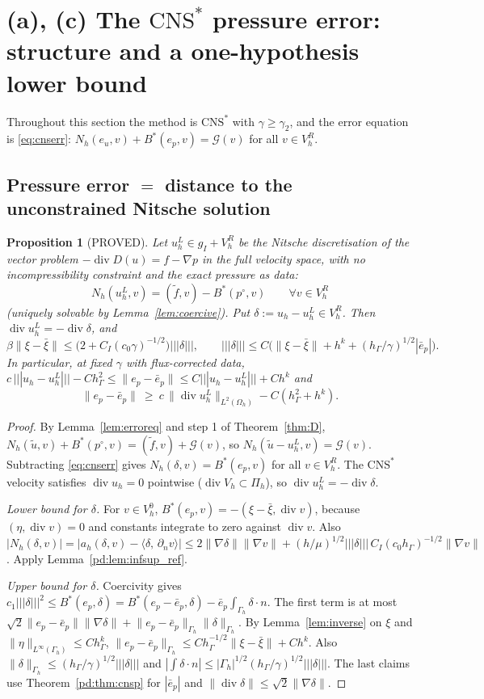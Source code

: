\documentclass[11pt,reqno]{amsart}
\theoremstyle{plain}
\newtheorem{proposition}[theorem]{Proposition}
\theoremstyle{definition}
\newcommand{\hG}{h_\Gamma}
\newcommand{\Gh}{\Gamma_h}
\newcommand{\Oh}{\Omega_h}
\newcommand{\Vh}{V_h}
\newcommand{\VR}{V_h^R}
\newcommand{\VO}{V_h^0}
\newcommand{\Pih}{\Pi_h}
\newcommand{\gI}{g_I}
\newcommand{\dn}{\partial_n}
\newcommand{\ut}{\tilde u}
\newcommand{\ft}{\tilde f}
\newcommand{\ip}[2]{\langle #1,\, #2\rangle}
\newcommand{\tnorm}[1]{|\!|\!|#1|\!|\!|}
\newcommand{\norm}[1]{\lVert #1\rVert}
\newcommand{\CNS}{\mathrm{CNS}^\ast}
\renewcommand{\div}{\operatorname{div}}
\newcommand{\Gc}{\mathcal G}
\begin{document}
\section{(a), (c) The \texorpdfstring{$\CNS$}{CNS*} pressure error: structure and a one-hypothesis lower bound}\label{misc:sec:a}

Throughout this section the method is $\CNS$ with $\gamma\ge\gamma_2$, and the error equation is \eqref{eq:cnserr}: $N_h(e_u,v)+B^\ast(e_p,v)=\Gc(v)$ for all $v\in\VR$.

\subsection{Pressure error $=$ distance to the unconstrained Nitsche solution}

\begin{proposition}[PROVED]\label{misc:prop:A1}
Let $u_h^L\in\gI+\VR$ be the Nitsche discretisation of the vector problem $-\div D(u)=f-\nabla p$ in the \emph{full} velocity space, with no incompressibility constraint and the exact pressure as data:
\[
N_h(u_h^L,v)=(\ft,v)-B^\ast(p^\circ,v)\qquad\forall v\in\VR
\]
(uniquely solvable by Lemma~\ref{lem:coercive}). Put $\delta:=u_h-u_h^L\in\VR$. Then $\div u_h^L=-\div\delta$, and
\[
\beta\norm{\xi-\bar\xi}\le\bigl(2+C_I(c_0\gamma)^{-1/2}\bigr)\tnorm\delta,\qquad
\tnorm\delta\le C\bigl(\norm{\xi-\bar\xi}+h^k+(\hG/\gamma)^{1/2}|\bar e_p|\bigr).
\]
In particular, at fixed $\gamma$ with flux-corrected data, $c\,\tnorm{u_h-u_h^L}-C\hG^2\le\norm{e_p-\bar e_p}\le C\tnorm{u_h-u_h^L}+Ch^k$ and
\[
\norm{e_p-\bar e_p}\ \ge\ c\,\norm{\div u_h^L}_{L^2(\Oh)}-C(\hG^2+h^k).
\]
\end{proposition}

\begin{proof}
By Lemma~\ref{lem:erroreq} and step 1 of Theorem~\ref{thm:D}, $N_h(\ut,v)+B^\ast(p^\circ,v)=(\ft,v)+\Gc(v)$, so $N_h(\ut-u_h^L,v)=\Gc(v)$. Subtracting \eqref{eq:cnserr} gives $N_h(\delta,v)=B^\ast(e_p,v)$ for all $v\in\VR$. The $\CNS$ velocity satisfies $\div u_h=0$ pointwise ($\div\Vh\subset\Pih$), so $\div u_h^L=-\div\delta$.

\emph{Lower bound for $\delta$.} For $v\in\VO$, $B^\ast(e_p,v)=-(\xi-\bar\xi,\div v)$, because $(\eta,\div v)=0$ and constants integrate to zero against $\div v$. Also $|N_h(\delta,v)|=|a_h(\delta,v)-\ip\delta{\dn v}|\le2\norm{\nabla\delta}\norm{\nabla v}+(h/\mu)^{1/2}\tnorm\delta\,C_I(c_0\hG)^{-1/2}\norm{\nabla v}$. Apply Lemma~\ref{pd:lem:infsup_ref}.

\emph{Upper bound for $\delta$.} Coercivity gives $c_1\tnorm\delta^2\le B^\ast(e_p,\delta)=B^\ast(e_p-\bar e_p,\delta)-\bar e_p\int_{\Gh}\delta\cdot n$. The first term is at most $\sqrt2\norm{e_p-\bar e_p}\norm{\nabla\delta}+\norm{e_p-\bar e_p}_{\Gh}\norm\delta_{\Gh}$. By Lemma~\ref{lem:inverse} on $\xi$ and $\norm\eta_{L^\infty(\Gh)}\le C\hG^k$, $\norm{e_p-\bar e_p}_{\Gh}\le C\hG^{-1/2}\norm{\xi-\bar\xi}+Ch^k$. Also $\norm\delta_{\Gh}\le(\hG/\gamma)^{1/2}\tnorm\delta$ and $|\int\delta\cdot n|\le|\Gh|^{1/2}(\hG/\gamma)^{1/2}\tnorm\delta$. The last claims use Theorem~\ref{pd:thm:cnsp} for $|\bar e_p|$ and $\norm{\div\delta}\le\sqrt2\norm{\nabla\delta}$.
\end{proof}
\end{document}

